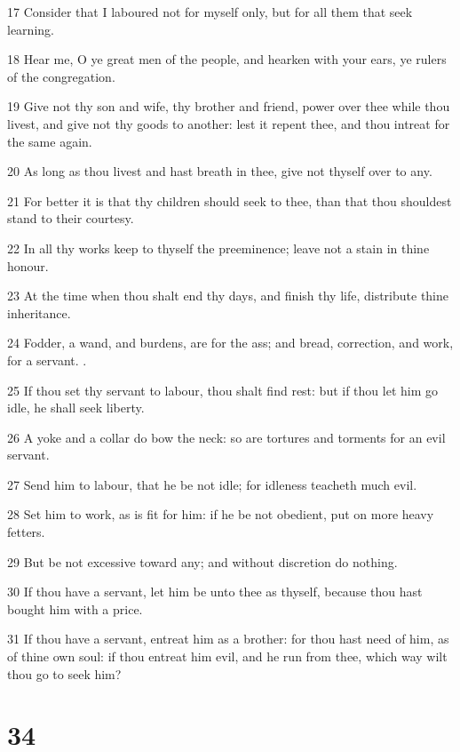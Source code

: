 \par 17 Consider that I laboured not for myself only, but for all them that seek learning.
\par 18 Hear me, O ye great men of the people, and hearken with your ears, ye rulers of the congregation.
\par 19 Give not thy son and wife, thy brother and friend, power over thee while thou livest, and give not thy goods to another: lest it repent thee, and thou intreat for the same again.
\par 20 As long as thou livest and hast breath in thee, give not thyself over to any.
\par 21 For better it is that thy children should seek to thee, than that thou shouldest stand to their courtesy.
\par 22 In all thy works keep to thyself the preeminence; leave not a stain in thine honour.
\par 23 At the time when thou shalt end thy days, and finish thy life, distribute thine inheritance.
\par 24 Fodder, a wand, and burdens, are for the ass; and bread, correction, and work, for a servant. .
\par 25 If thou set thy servant to labour, thou shalt find rest: but if thou let him go idle, he shall seek liberty.
\par 26 A yoke and a collar do bow the neck: so are tortures and torments for an evil servant.
\par 27 Send him to labour, that he be not idle; for idleness teacheth much evil.
\par 28 Set him to work, as is fit for him: if he be not obedient, put on more heavy fetters.
\par 29 But be not excessive toward any; and without discretion do nothing.
\par 30 If thou have a servant, let him be unto thee as thyself, because thou hast bought him with a price.
\par 31 If thou have a servant, entreat him as a brother: for thou hast need of him, as of thine own soul: if thou entreat him evil, and he run from thee, which way wilt thou go to seek him?

\chapter{34}

